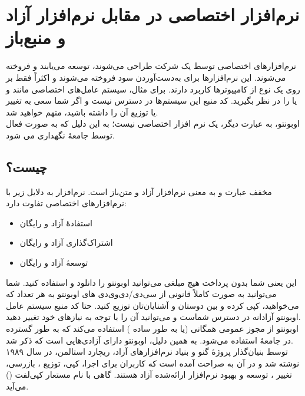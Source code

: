 \section{نرم‌افزار اختصاصی در مقابل نرم‌افزار آزاد و منبع‌باز}
نرم‌افزارهای اختصاصی توسط یک شرکت طراحی می‌شوند، توسعه می‌یابند و فروخته می‌شوند. این نرم‌افزارها برای به‌دست‌آوردن سود فروخته می‌شوند و اکثراً فقط بر روی یک نوع از کامپیوترها کاربرد دارند. برای مثال، سیستم عامل‌های اختصاصی مانند  و یا  را در نظر بگیرید. کد منبع این سیستم‌ها در دسترس نیست و اگر شما سعی به تغییر یا توزیع آن را داشته باشید، متهم خواهید شد.\\
اوبونتو، به عبارت دیگر، یک نرم افزار اختصاصی نیست؛ به این دلیل که به صورت فعال توسط جامعهٔ  نگهداری می شود.

\subsection
{
چیست؟
}

 مخفف عبارت  و به معنی نرم‌افزار آزاد و متن‌باز است. نرم‌افزار  به دلایل زیر با نرم‌افزارهای اختصاصی تفاوت دارد:

\begin{itemize}
\item استفادهٔ آزاد و رایگان
\item اشتراک‌گذاری آزاد و رایگان
\item توسعهٔ آزاد و رایگان
\end{itemize}

این یعنی شما بدون پرداخت هیچ مبلغی می‌توانید اوبونتو را دانلود و استفاده کنید. شما می‌توانید به صورت کاملاً قانونی از سی‌دی/دی‌وی‌دی های اوبونتو به هر تعداد که می‌خواهید، کپی کرده و بین دوستان و آشنایان‌تان توزیع کنید. حتا کد منبع سیستم عامل اوبونتو آزادانه در دسترس شماست و می‌توانید آن را با توجه به نیازهای خود تغییر دهید.\\
اوبونتو از مجوز عمومی همگانی   (یا به طور ساده ) استفاده می‌کند که به طور گسترده در جامعهٔ  استفاده می‌شود. به همین دلیل، اوبونتو دارای آزادی‌هایی است که ذکر شد.\\
 توسط بنیان‌گذار پروژهٔ گنو و بنیاد نرم‌افزارهای آزاد، ریچارد استالمن، در سال ۱۹۸۹ نوشته شد و در آن به صراحت آمده است که کاربران برای اجرا، کپی، توزیع ، بازرسی، تغییر ، توسعه و بهبود نرم‌افزار ارائه‌شده آزاد هستند. گاهی  با  نام مستعار کپی‌لفت () می‌آید.

